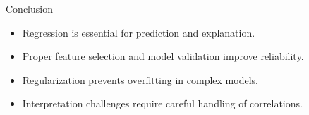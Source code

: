 \documentclass{beamer}
\begin{document}
\begin{frame}{Conclusion}
    \begin{itemize}
        \item Regression is essential for prediction and explanation.
        \item Proper feature selection and model validation improve reliability.
        \item Regularization prevents overfitting in complex models.
        \item Interpretation challenges require careful handling of correlations.
    \end{itemize}
\end{frame}
\end{document}
